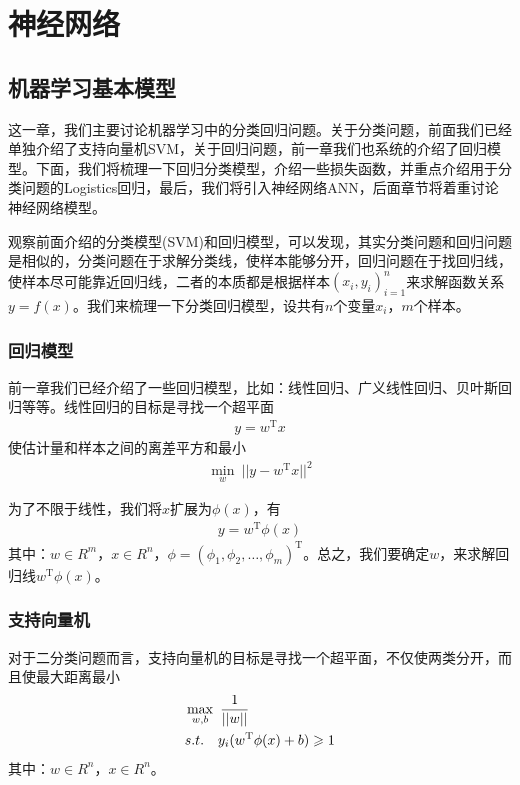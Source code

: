 % 
\chapter{神经网络}
\section{机器学习基本模型}
    \par
    这一章，我们主要讨论机器学习中的分类回归问题。关于分类问题，前面我们已经单独介绍了支持向量机SVM，关于回归问题，前一章我们也系统的介绍了回归模型。下面，我们将梳理一下回归分类模型，介绍一些损失函数，并重点介绍用于分类问题的Logistics回归，最后，我们将引入神经网络ANN，后面章节将着重讨论神经网络模型。
    \par
    观察前面介绍的分类模型(SVM)和回归模型，可以发现，其实分类问题和回归问题是相似的，分类问题在于求解分类线，使样本能够分开，回归问题在于找回归线，使样本尽可能靠近回归线，二者的本质都是根据样本$(x_i,y_i)_{i=1}^n$来求解函数关系$y = f(x)$。我们来梳理一下分类回归模型，设共有$n$个变量$x_i$，$m$个样本。
    \subsection{回归模型}
        \par
        前一章我们已经介绍了一些回归模型，比如：线性回归、广义线性回归、贝叶斯回归等等。线性回归的目标是寻找一个超平面
        \begin{align*}
        y = w^\mathrm{T}x
        \end{align*}
        使估计量和样本之间的离差平方和最小
        \begin{align}
        \label{线性回归的最小二乘目标}
        \min_w \ ||y - w^\mathrm{T}x||^2
        \end{align}
        \par
        为了不限于线性，我们将$x$扩展为$\phi(x)$，有
        \begin{align*}
        y = w^\mathrm{T}\phi(x)
        \end{align*}
        其中：$w\in R^{m}$，$x\in R^n$，$\phi = (\phi_1,\phi_2,\dots,\phi_m)^\mathrm{T}$。总之，我们要确定$w$，来求解回归线$w^\mathrm{T}\phi(x)$。
    \subsection{支持向量机}
        \par
        对于二分类问题而言，支持向量机的目标是寻找一个超平面，不仅使两类分开，而且使最大距离最小
        \begin{align}
        \label{二分类支持向量机的优化目标}
        &\max_{w,b} \ \frac{1}{||w||}\\
        &s.t. \quad y_i(w^\mathrm{T}\phi(x)+b) \geqslant 1 \notag
        \end{align}
        其中：$w\in R^n$，$x\in R^n$。
